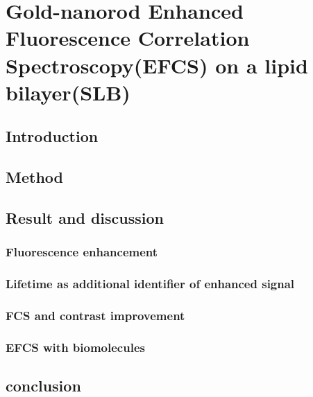 \chapter{Gold-nanorod Enhanced Fluorescence Correlation Spectroscopy(EFCS) on a lipid bilayer(SLB)}
\label{chapter:EFCS}

\section{Introduction}
\section{Method}
\section{Result and discussion}
\subsection{Fluorescence enhancement}
\subsection{Lifetime as additional identifier of enhanced signal}
\subsection{FCS and contrast improvement}
\subsection{EFCS with biomolecules}
\section{conclusion}
